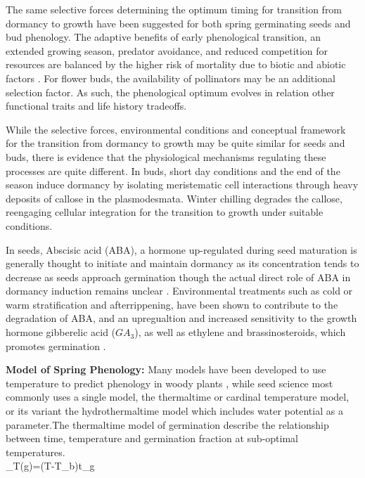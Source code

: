 \documentclass{article}\usepackage[]{graphicx}\usepackage[]{color}
\begin{document}
\par The same selective forces determining the optimum timing for transition from dormancy to growth have been suggested for both spring germinating seeds and bud phenology. The adaptive benefits of early phenological transition, an extended growing season, predator avoidance, and reduced competition for resources are balanced by the higher risk of mortality due to biotic and abiotic factors \citep{Rathcke1985}. For flower buds, the availability of pollinators may be an additional selection factor. As such, the phenological optimum evolves in relation other functional traits and life history tradeoffs. 
\par While the selective forces, environmental conditions and conceptual framework for the transition from dormancy to growth may be quite similar for seeds and buds, there is evidence that the physiological mechanisms regulating these processes are quite different. In buds, short day conditions and the end of the season induce dormancy by isolating meristematic cell interactions through heavy deposits of callose in the plasmodesmata\citep{Rinne2011,Sager2014}. Winter chilling degrades the callose, reengaging cellular integration for the transition to growth under suitable conditions. 
\par In seeds, Abscisic acid (ABA), a hormone up-regulated during seed maturation is generally thought to initiate and maintain dormancy as its concentration tends to decrease as seeds approach germination  though the actual direct role of ABA in dormancy induction remains unclear \citep{Baskin2002}. Environmental treatments such as cold or warm stratification and afterrippening, have been shown to contribute to the degradation of ABA, and an upregualtion and increased sensitivity to the growth hormone gibberelic acid ($GA_3$), as well as ethylene and brassinosteroids, which promotes germination \citep{Kucera2005}.

\textbf{Model of Spring Phenology:} Many models have been developed to use temperature to predict phenology in woody plants \citep{Chuine2002}, while seed science most commonly uses a single model, the thermaltime or cardinal temperature model, or its variant the hydrothermaltime model which includes water potential as a parameter\citep {Bradford2002}.The thermaltime model of germination describe the relationship between time, temperature and germination fraction at sub-optimal temperatures.\\

\theta_{T}(g)=(T-T_{b})t_{g}\\
\end{document}
